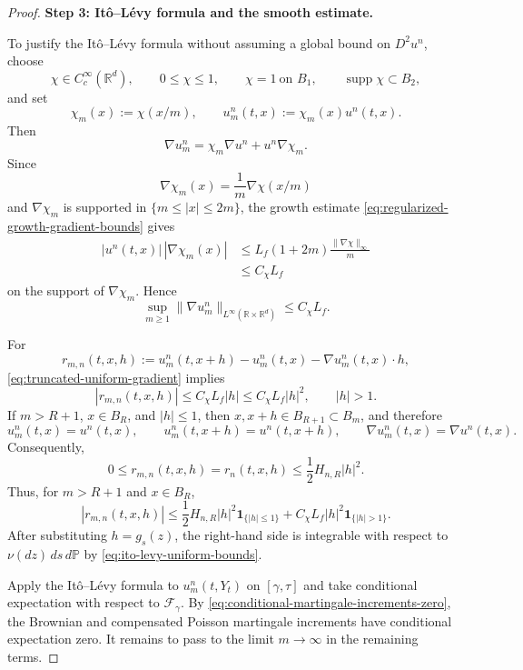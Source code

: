 \documentclass[10pt,a4paper]{amsart}
\begin{document}
\begin{proof}
	

	\textbf{Step 3: It\^o--L\'evy formula and the smooth estimate.}
	
	To justify the It\^o--L\'evy formula without assuming a global bound
	on \(D^2u^n\), choose
	\[
	\chi\in C_c^\infty(\mathbb R^d),
	\qquad
	0\leq\chi\leq1,
	\qquad
	\chi=1\ \text{on }B_1,
	\qquad
	\operatorname{supp}\chi\subset B_2,
	\]
	and set
	\[
	\chi_m(x):=\chi(x/m),
	\qquad
	u_m^n(t,x):=\chi_m(x)u^n(t,x).
	\]
	Then
	\[
	\nabla u_m^n
	=
	\chi_m\nabla u^n
	+
	u^n\nabla\chi_m.
	\]
	Since
	\[
	\nabla\chi_m(x)
	=
	\frac1m\nabla\chi(x/m)
	\]
	and \(\nabla\chi_m\) is supported in
	\(\{m\leq|x|\leq2m\}\), the growth estimate
	\eqref{eq:regularized-growth-gradient-bounds} gives
	\[
	\begin{aligned}
		|u^n(t,x)|\,|\nabla\chi_m(x)|
		&\leq
		L_f(1+2m)
		\frac{\|\nabla\chi\|_\infty}{m}
		\\
		&\leq
		C_\chi L_f
	\end{aligned}
	\]
	on the support of \(\nabla\chi_m\). Hence
	\begin{equation}
		\label{eq:truncated-uniform-gradient}
		\sup_{m\geq1}
		\|\nabla u_m^n\|_{L^\infty(\mathbb R\times\mathbb R^d)}
		\leq
		C_\chi L_f.
	\end{equation}
	
	For
	\[
	r_{m,n}(t,x,h)
	:=
	u_m^n(t,x+h)
	-u_m^n(t,x)
	-\nabla u_m^n(t,x)\cdot h,
	\]
	\eqref{eq:truncated-uniform-gradient} implies
	\[
	|r_{m,n}(t,x,h)|
	\leq
	C_\chi L_f|h|
	\leq
	C_\chi L_f|h|^2,
	\qquad |h|>1.
	\]
	If \(m>R+1\), \(x\in B_R\), and \(|h|\leq1\), then
	\(x,x+h\in B_{R+1}\subset B_m\), and therefore
	\[
	u_m^n(t,x)=u^n(t,x),
	\qquad
	u_m^n(t,x+h)=u^n(t,x+h),
	\qquad
	\nabla u_m^n(t,x)=\nabla u^n(t,x).
	\]
	Consequently,
	\[
	0
	\leq
	r_{m,n}(t,x,h)
	=
	r_n(t,x,h)
	\leq
	\frac12H_{n,R}|h|^2.
	\]
	Thus, for \(m>R+1\) and \(x\in B_R\),
	\begin{equation}
		\label{eq:truncated-jump-dominator}
		|r_{m,n}(t,x,h)|
		\leq
		\frac12H_{n,R}|h|^2
		\mathbf1_{\{|h|\leq1\}}
		+
		C_\chi L_f|h|^2
		\mathbf1_{\{|h|>1\}}.
	\end{equation}
	After substituting \(h=g_s(z)\), the right-hand side is integrable
	with respect to
	\(\nu(dz)\,ds\,d\mathbb P\) by
	\eqref{eq:ito-levy-uniform-bounds}.
	
Apply the It\^o--L\'evy formula to \(u_m^n(t,Y_t)\) on
\([\gamma,\tau]\) and take conditional expectation with respect to
\(\mathcal F_\gamma\). By
\eqref{eq:conditional-martingale-increments-zero}, the Brownian and
compensated Poisson martingale increments have conditional expectation
zero. It remains to pass to the limit \(m\to\infty\) in the remaining
terms.


\end{proof}
\end{document}
